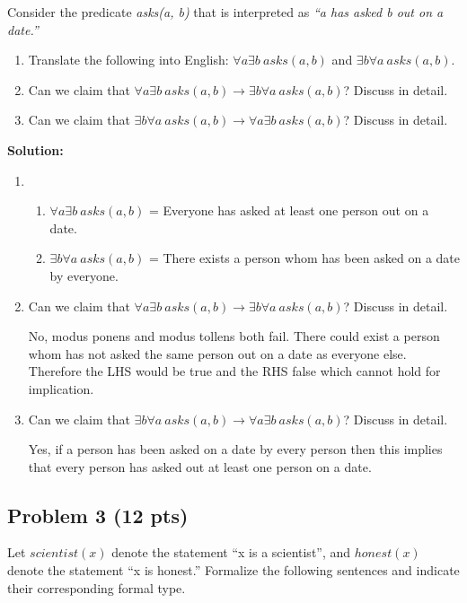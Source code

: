 \documentclass[12pt]{article}
\begin{document}
Consider the predicate \textit{asks(a, b)} that is interpreted as \textit{``a has asked b out on a date.''}
\begin{enumerate}
\item Translate the following into English: $\forall a \exists b~asks(a, b)$ and $\exists b \forall a ~asks(a, b)$.
\item Can we claim that $\forall a \exists b~asks(a, b) \rightarrow \exists b \forall a ~asks(a, b)$? Discuss in detail.
\item Can we claim that $\exists b \forall a ~asks(a, b) \rightarrow \forall a \exists b~asks(a, b)$? Discuss in detail.
\end{enumerate}

\bigskip
\noindent \textbf{Solution:}
\begin{enumerate}
\item \begin{enumerate}
\item $\forall a \exists b~asks(a, b)$ = Everyone has asked at least one person out on a date.
\item $\exists b \forall a ~asks(a, b)$ = There exists a person whom has been asked on a date by everyone.
\end{enumerate}
\item Can we claim that $\forall a \exists b~asks(a, b) \rightarrow \exists b \forall a ~asks(a, b)$? Discuss in detail.

No, modus ponens and modus tollens both fail. There could exist a person whom has not asked the same person out on a date as everyone else. Therefore the LHS
would be true and the RHS false which cannot hold for implication.

\item Can we claim that $\exists b \forall a ~asks(a, b) \rightarrow \forall a \exists b~asks(a, b)$? Discuss in detail.

Yes, if a person has been asked on a date by every person then this implies that every person has asked out at least one person on a date.
\end{enumerate}




\newpage

\subsection{Problem 3 (12 pts)}

\noindent Let $scientist(x)$ denote the statement ``x is a scientist'', and $honest(x)$ denote the statement ``x is honest.'' Formalize the following sentences and indicate their corresponding formal type.
\end{document}
